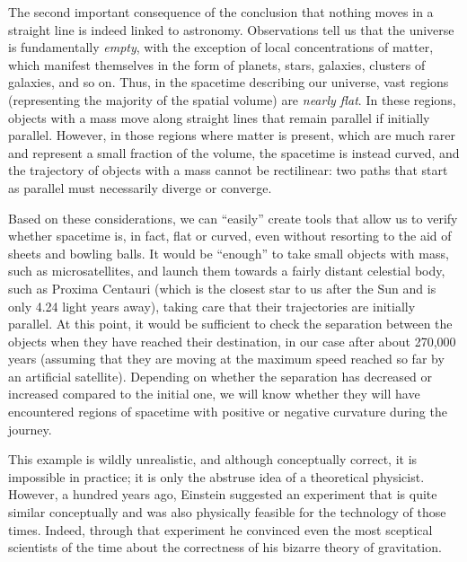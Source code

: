 The second important consequence of the conclusion that nothing moves in a straight line
is indeed linked to astronomy. Observations tell us that the universe is fundamentally
\emph{empty}, with the exception of local concentrations of matter, which manifest
themselves in the form of planets, stars, galaxies, clusters of galaxies, and so on.
Thus, in the spacetime describing our universe, vast regions (representing the majority
of the spatial volume) are \emph{nearly flat}.  In these regions,
objects with a mass move along straight lines that remain parallel if initially
parallel. However, in those regions where matter is present, which are much rarer and
represent a small fraction of the volume, the spacetime is instead curved, and the
trajectory of objects with a mass cannot be rectilinear: two paths that start as
parallel must necessarily diverge or converge.

Based on these considerations, we can ``easily'' create tools that allow us to verify
whether spacetime is, in fact, flat or curved, even without resorting to the aid of
sheets and bowling balls. It would be ``enough'' to take small objects with mass, such
as microsatellites, and launch them towards a fairly distant celestial body, such as
Proxima Centauri (which is the closest star to us after the Sun and
is only 4.24 light years away), taking care that their trajectories are initially
parallel. At this point, it would be sufficient to check the separation between the
objects when they have reached their destination, in our case after about 270,000 years
(assuming that they are moving at the maximum speed reached so far by an artificial
satellite). Depending on whether the separation has decreased or increased compared to
the initial one, we will know whether they will have encountered regions of spacetime
with positive or negative curvature during the journey.

This example is wildly unrealistic, and although conceptually correct, it is impossible
in practice; it is only the abstruse idea of a theoretical physicist. However, a hundred
years ago, Einstein suggested an experiment that is quite similar conceptually and was
also physically feasible for the technology of those times. Indeed, through that
experiment he convinced even the most sceptical scientists of the time about the
correctness of his bizarre theory of gravitation.

